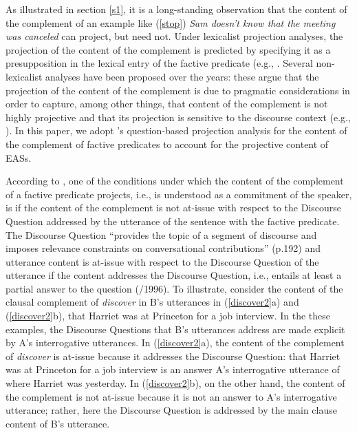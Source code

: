 \documentclass[11pt,fleqn]{article}
\newcommand{\6}{\mbox{$[\hspace*{-.6mm}[$}}
\newcommand{\9}{\mbox{$]\hspace*{-.6mm}]$}}
\newcommand{\citepos}[1]{\citeauthor{#1}'s \citeyear{#1}}
\begin{document}
As illustrated in section \ref{s1}, it is a long-standing observation that the content of the complement of an example like (\ref{stop}) {\em Sam doesn't know that the meeting was canceled} can project, but need not. Under lexicalist projection analyses, the projection of the content of the complement is predicted by specifying it as a presupposition in the lexical entry of the factive predicate (e.g., \citealt{heim83,vds92,schlenker10}. Several non-lexicalist analyses have been proposed over the years: these argue that the projection of the content of the complement is due to pragmatic considerations in order to capture, among other things, that content of the complement is not highly projective and that its projection is sensitive to the discourse context (e.g., \citealt{wilson75,simons01,abusch02,abusch10,abrusan2011,abrusan2016,romoli2015}). In this paper, we adopt \citepos{best-question} question-based projection analysis for the content of the complement of factive predicates to account for the projective content of EASs.

According to \citealt{best-question}, one of the conditions under which the content of the complement of a factive predicate projects, i.e., is understood as a commitment of the speaker, is if the content of the complement is not at-issue with respect to the Discourse Question addressed by the utterance of the sentence with the factive predicate. The Discourse Question ``provides the topic of a segment of discourse and imposes relevance constraints on conversational contributions'' (p.192) and utterance content is at-issue with respect to the Discourse Question of the utterance if the content addresses the Discourse Question, i.e., entails at least a partial answer to the question (\citealt{roberts12}/1996). To illustrate, consider the content of the clausal complement of {\em discover} in B's utterances in (\ref{discover2}a) and (\ref{discover2}b), that Harriet was at Princeton for a job interview. In the these examples, the Discourse Questions that B's utterances address are made explicit by A's interrogative utterances. In (\ref{discover2}a), the content of the  complement of {\em discover} is at-issue because it addresses the Discourse Question: that Harriet was at Princeton for a job interview is an answer A's interrogative utterance of where Harriet was yesterday. In (\ref{discover2}b), on the other hand, the content of the complement is not at-issue because it is not an answer to A's interrogative utterance; rather, here the Discourse Question is addressed by the main clause content of B's utterance.
\end{document}
